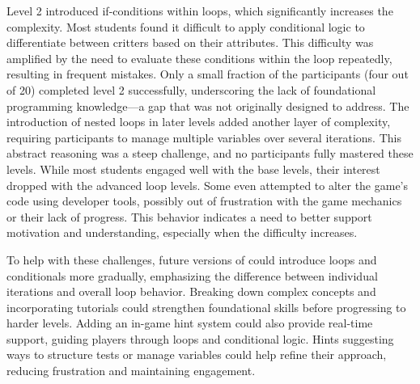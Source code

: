 Level 2 introduced if-conditions within loops, which significantly increases the complexity. Most students found it difficult to apply conditional logic to differentiate between critters based on their attributes. This difficulty was amplified by the need to evaluate these conditions within the loop repeatedly, resulting in frequent mistakes. Only a small fraction of the participants (four out of 20) completed level 2 successfully, underscoring the lack of foundational programming knowledge—a gap that \toolname was not originally designed to address.
%
The introduction of nested loops in later levels added another layer of complexity, requiring participants to manage multiple variables over several iterations. This abstract reasoning was a steep challenge, and no participants fully mastered these levels.
%
While most students engaged well with the base levels, their interest dropped with the advanced loop levels. Some even attempted to alter the game's code using developer tools, possibly out of frustration with the game mechanics or their lack of progress. This behavior indicates a need to better support motivation and understanding, especially when the difficulty increases.

To help with these challenges, future versions of \toolname could introduce loops and conditionals more gradually, emphasizing the difference between individual iterations and overall loop behavior. Breaking down complex concepts and incorporating tutorials could strengthen foundational skills before progressing to harder levels. Adding an in-game hint system could also provide real-time support, guiding players through loops and conditional logic. Hints suggesting ways to structure tests or manage variables could help refine their approach, reducing frustration and maintaining engagement.
